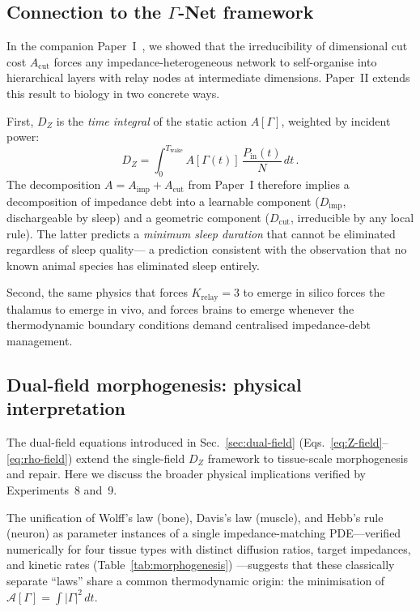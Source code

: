 ﻿\documentclass[aps,pre,twocolumn,superscriptaddress,floatfix]{revtex4-2}
\begin{document}
\subsection{Connection to the $\Gamma$-Net framework}

In the companion Paper~I~\cite{PaperI}, we showed
that the irreducibility of dimensional cut cost
$A_{\mathrm{cut}}$ forces any impedance-heterogeneous
network to self-organise into hierarchical layers
with relay nodes at intermediate dimensions.
Paper~II extends this result to biology in two concrete ways.

First, $D_Z$ is the \emph{time integral} of the static
action $A[\Gamma]$, weighted by incident power:
\begin{equation}
  D_Z = \int_0^{T_{\mathrm{wake}}}
    A[\Gamma(t)]\,\frac{P_{\mathrm{in}}(t)}{N}\,dt\,.
  \label{eq:DZ-from-A}
\end{equation}
The decomposition $A = A_{\mathrm{imp}} + A_{\mathrm{cut}}$
from Paper~I therefore implies a decomposition of
impedance debt into a learnable component
($D_{\mathrm{imp}}$, dischargeable by sleep)
and a geometric component
($D_{\mathrm{cut}}$, irreducible by any local rule).
The latter predicts a \emph{minimum sleep duration}
that cannot be eliminated regardless of sleep quality---
a prediction consistent with the observation that no
known animal species has eliminated sleep entirely.

Second, the same physics that forces $K_{\mathrm{relay}}=3$
to emerge in silico forces the thalamus to emerge
in vivo, and forces brains to emerge
whenever the thermodynamic boundary conditions
demand centralised impedance-debt management.

\subsection{Dual-field morphogenesis: physical interpretation}
\label{sec:material-bottleneck}

The dual-field equations introduced in Sec.~\ref{sec:dual-field}
(Eqs.~\eqref{eq:Z-field}--\eqref{eq:rho-field})
extend the single-field $D_Z$ framework to tissue-scale
morphogenesis and repair.
Here we discuss the broader physical implications verified
by Experiments~8 and~9.

The unification of Wolff's law (bone), Davis's law (muscle),
and Hebb's rule (neuron) as parameter instances of a
single impedance-matching PDE---verified numerically for
four tissue types with distinct diffusion ratios, target
impedances, and kinetic rates (Table~\ref{tab:morphogenesis})
---suggests that these classically separate ``laws'' share
a common thermodynamic origin: the minimisation of
$\mathcal{A}[\Gamma] = \int |\Gamma|^2\,dt$.
\end{document}
